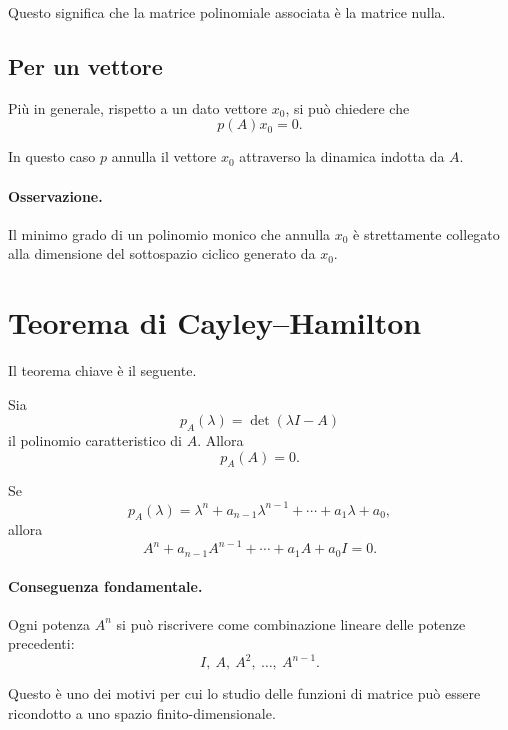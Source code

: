 Questo significa che la matrice polinomiale associata è la matrice nulla.

\subsection{Per un vettore}

Più in generale, rispetto a un dato vettore $x_0$, si può chiedere che
\begin{equation}
p(A)x_0=0.
\label{eq:L5_annihilating_poly_vector}
\end{equation}

In questo caso $p$ annulla il vettore $x_0$ attraverso la dinamica indotta da $A$.

\paragraph{Osservazione.}
Il minimo grado di un polinomio monico che annulla $x_0$ è strettamente collegato alla dimensione del sottospazio ciclico generato da $x_0$.

\section{Teorema di Cayley--Hamilton}

Il teorema chiave è il seguente.

\begin{teorema}
Sia
\[
p_A(\lambda)=\det(\lambda I-A)
\]
il polinomio caratteristico di $A$. Allora
\begin{equation}
p_A(A)=0.
\label{eq:L5_CH}
\end{equation}
\end{teorema}

Se
\[
p_A(\lambda)=\lambda^n+a_{n-1}\lambda^{n-1}+\cdots+a_1\lambda+a_0,
\]
allora
\begin{equation}
A^n+a_{n-1}A^{n-1}+\cdots+a_1A+a_0I=0.
\label{eq:L5_CH_expanded}
\end{equation}

\paragraph{Conseguenza fondamentale.}
Ogni potenza $A^n$ si può riscrivere come combinazione lineare delle potenze precedenti:
\[
I,\ A,\ A^2,\ \dots,\ A^{n-1}.
\]

Questo è uno dei motivi per cui lo studio delle funzioni di matrice può essere ricondotto a uno spazio finito-dimensionale.

